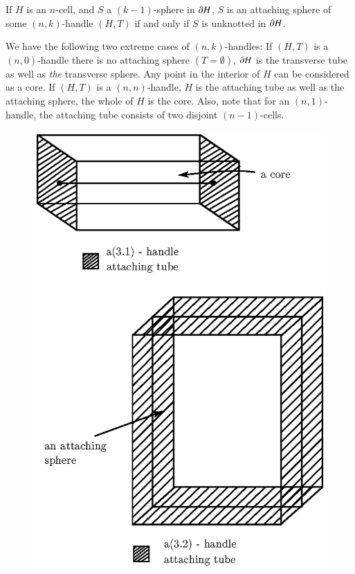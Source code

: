 \begin{ex}\label{chap8-ex8.1.1}
If $H$ is an $n$-cell, and $S$ a $(k-1)$-sphere in $\partial H$, $S$ is an attaching sphere of some $(n,k)$-handle $(H,T)$ if and only if $S$ is unknotted in $\partial H$.
\end{ex}

We have the following two extreme cases of $(n,k)$-handles: If $(H,T)$ is a $(n,0)$-handle there is no attaching sphere $(T=\emptyset)$, $\partial H$ is the transverse tube as well as {\em the} transverse sphere. Any point in the interior of $H$ can be considered as a core. If $(H,T)$ is a $(n,n)$-handle, $H$ is the attaching tube as well as the attaching sphere, the whole of $H$ is the core. Also, note that for an $(n,1)$-handle, the attaching tube consists of two disjoint $(n-1)$-cells.

\newpage

\begin{figure}[H]
\centering
\includegraphics{figure/fig24.eps}
\end{figure}\pageoriginale

